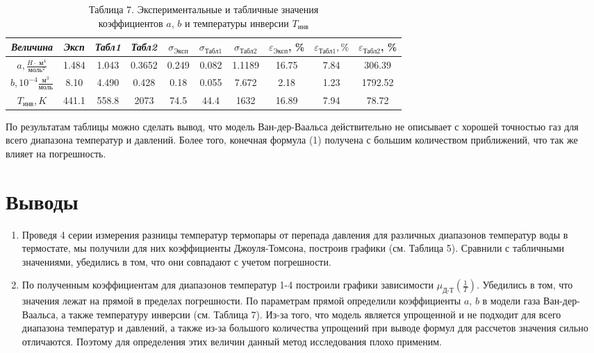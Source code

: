 \documentclass[a4paper]{article}
\begin{document}
\begin{enumerate}
\begin{table}[h!]
    \centering
    \begin{tabular}{|c|c|c|c|c|c|c|c|c|c|}
        \hline
        \textit{Величина} & \textit{Эксп} & \textit{Табл1} & \textit{Табл2} & $\sigma_{\text{Эксп}}$ & $\sigma_{\text{Табл1}}$ & $\sigma_{\text{Табл2}}$ & $\varepsilon_{\text{Эксп}}$, \% & $\varepsilon_{\text{Табл1}}, \%$ & $\varepsilon_{\text{Табл2}}$, \% \\ 
        \hline
        $a, \frac{H\cdot\text{ м} ^4}{\text{моль} ^2}$ & 1.484 & 1.043 & 0.3652 & 0.249 & 0.082 & 1.1189 & 16.75 & 7.84 & 306.39 \\ \hline
        $b, 10^{-4} \frac{\text{м} ^3}{\text{моль}}$ & 8.10 & 4.490 & 0.428 & 0.18 & 0.055 & 7.672 & 2.18 & 1.23 & 1792.52 \\ \hline
        $T_{\text{инв}}, K$ & 441.1 & 558.8 & 2073\footnotemark[1] & 74.5 & 44.4 & 1632 & 16.89 & 7.94 & 78.72 \\ 
        \hline
    \end{tabular}
    \caption{Таблица 7. Экспериментальные и табличные значения\\ коэффициентов $a$, $b$ и температуры инверсии $T_{\text{инв}}$}
\end{table}

По результатам таблицы можно сделать вывод, что модель Ван-дер-Ваальса действительно не описывает с хорошей точностью газ для всего диапазона температур и давлений. Более того, конечная формула (1) получена с большим количеством приближений, что так же влияет на погрешность.
\end{enumerate}
\section{Выводы}
\begin{enumerate}
\item Проведя 4 серии измерения разницы температур термопары от перепада давления для различных диапазонов температур воды в термостате, мы получили для них коэффициенты Джоуля-Томсона, построив графики (см. Таблица 5). Сравнили с табличными значениями, убедились в том, что они совпадают с учетом погрешности.
\item По полученным коэффициентам для диапазонов температур 1-4 построили графики зависимости $\mu_{\text{Д-Т}}(\frac{1}{T})$. Убедились в том, что значения лежат на прямой в пределах погрешности. По параметрам прямой определили коэффициенты $a$, $b$ в модели газа Ван-дер-Ваальса, а также температуру инверсии (см. Таблица 7). Из-за того, что модель является упрощенной и не подходит для всего диапазона температур и давлений, а также из-за большого количества упрощений при выводе формул для рассчетов значения сильно отличаются. Поэтому для определения этих величин данный метод исследования плохо применим.



\end{enumerate}
\end{document}
